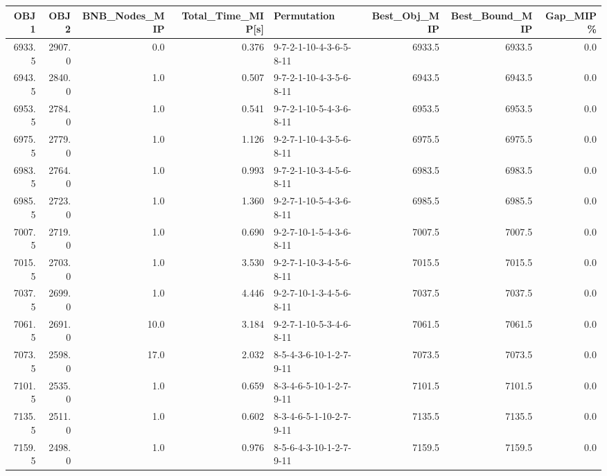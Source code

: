 \begin{tabular}{rrrrlrrr}
\toprule
   OBJ1 &    OBJ2 &  BNB\_Nodes\_MIP &  Total\_Time\_MIP[s] &              Permutation &  Best\_Obj\_MIP &  Best\_Bound\_MIP &  Gap\_MIP\% \\
\midrule
 6933.5 &  2907.0 &            0.0 &              0.376 &  9-7-2-1-10-4-3-6-5-8-11 &        6933.5 &          6933.5 &       0.0 \\
 6943.5 &  2840.0 &            1.0 &              0.507 &  9-7-2-1-10-4-3-5-6-8-11 &        6943.5 &          6943.5 &       0.0 \\
 6953.5 &  2784.0 &            1.0 &              0.541 &  9-7-2-1-10-5-4-3-6-8-11 &        6953.5 &          6953.5 &       0.0 \\
 6975.5 &  2779.0 &            1.0 &              1.126 &  9-2-7-1-10-4-3-5-6-8-11 &        6975.5 &          6975.5 &       0.0 \\
 6983.5 &  2764.0 &            1.0 &              0.993 &  9-7-2-1-10-3-4-5-6-8-11 &        6983.5 &          6983.5 &       0.0 \\
 6985.5 &  2723.0 &            1.0 &              1.360 &  9-2-7-1-10-5-4-3-6-8-11 &        6985.5 &          6985.5 &       0.0 \\
 7007.5 &  2719.0 &            1.0 &              0.690 &  9-2-7-10-1-5-4-3-6-8-11 &        7007.5 &          7007.5 &       0.0 \\
 7015.5 &  2703.0 &            1.0 &              3.530 &  9-2-7-1-10-3-4-5-6-8-11 &        7015.5 &          7015.5 &       0.0 \\
 7037.5 &  2699.0 &            1.0 &              4.446 &  9-2-7-10-1-3-4-5-6-8-11 &        7037.5 &          7037.5 &       0.0 \\
 7061.5 &  2691.0 &           10.0 &              3.184 &  9-2-7-1-10-5-3-4-6-8-11 &        7061.5 &          7061.5 &       0.0 \\
 7073.5 &  2598.0 &           17.0 &              2.032 &  8-5-4-3-6-10-1-2-7-9-11 &        7073.5 &          7073.5 &       0.0 \\
 7101.5 &  2535.0 &            1.0 &              0.659 &  8-3-4-6-5-10-1-2-7-9-11 &        7101.5 &          7101.5 &       0.0 \\
 7135.5 &  2511.0 &            1.0 &              0.602 &  8-3-4-6-5-1-10-2-7-9-11 &        7135.5 &          7135.5 &       0.0 \\
 7159.5 &  2498.0 &            1.0 &              0.976 &  8-5-6-4-3-10-1-2-7-9-11 &        7159.5 &          7159.5 &       0.0 \\

\end{tabular}
